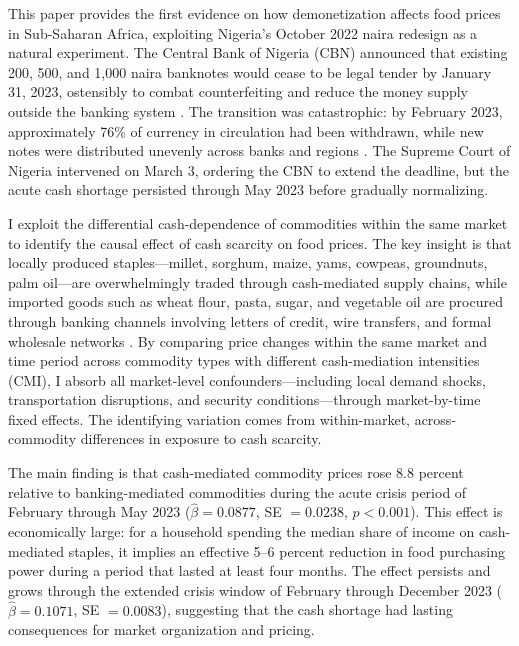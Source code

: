 \documentclass[12pt]{article}
\begin{document}
This paper provides the first evidence on how demonetization affects food prices in Sub-Saharan Africa, exploiting Nigeria's October 2022 naira redesign as a natural experiment. The Central Bank of Nigeria (CBN) announced that existing 200, 500, and 1,000 naira banknotes would cease to be legal tender by January 31, 2023, ostensibly to combat counterfeiting and reduce the money supply outside the banking system \citep{cbn2022redesign}. The transition was catastrophic: by February 2023, approximately 76\% of currency in circulation had been withdrawn, while new notes were distributed unevenly across banks and regions \citep{economist2023naira}. The Supreme Court of Nigeria intervened on March 3, ordering the CBN to extend the deadline, but the acute cash shortage persisted through May 2023 before gradually normalizing.

I exploit the differential cash-dependence of commodities within the same market to identify the causal effect of cash scarcity on food prices. The key insight is that locally produced staples---millet, sorghum, maize, yams, cowpeas, groundnuts, palm oil---are overwhelmingly traded through cash-mediated supply chains, while imported goods such as wheat flour, pasta, sugar, and vegetable oil are procured through banking channels involving letters of credit, wire transfers, and formal wholesale networks \citep{adesina2023, aker2010information}. By comparing price changes within the same market and time period across commodity types with different cash-mediation intensities (CMI), I absorb all market-level confounders---including local demand shocks, transportation disruptions, and security conditions---through market-by-time fixed effects. The identifying variation comes from within-market, across-commodity differences in exposure to cash scarcity.

The main finding is that cash-mediated commodity prices rose 8.8 percent relative to banking-mediated commodities during the acute crisis period of February through May 2023 ($\hat{\beta} = 0.0877$, SE $= 0.0238$, $p < 0.001$). This effect is economically large: for a household spending the median share of income on cash-mediated staples, it implies an effective 5--6 percent reduction in food purchasing power during a period that lasted at least four months. The effect persists and grows through the extended crisis window of February through December 2023 ($\hat{\beta} = 0.1071$, SE $= 0.0083$), suggesting that the cash shortage had lasting consequences for market organization and pricing.
\end{document}
